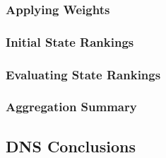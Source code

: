 \subsubsection{Applying Weights}

\subsubsection{Initial State Rankings}



\subsubsection{Evaluating State Rankings}

\subsubsection{Aggregation Summary}












\subsection{DNS Conclusions}